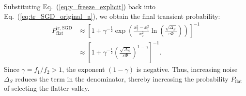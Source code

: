 \documentclass[aps,prx,reprint,superscriptaddress,longbibliography,nofootinbib,floatfix]{revtex4-2}
\begin{document}
Substituting Eq.~(\ref{eq:y_freeze_explicit}) back into Eq.~(\ref{eq:tr_SGD_original_a}), we obtain the final transient probability:
\begin{equation}
\label{eq:final_ptr_corrected}
\begin{split}
    P_{\mathrm{flat}}^{\mathrm{tr,SGD}} 
    &\approx  \left[1+\gamma^{-\frac{1}{2}} \exp\!\left(\frac{x_2^2-x_1^2}{x_2^2} \ln\left( \frac{\sqrt{\Delta_S}}{\varepsilon \Phi} \right)\right)\right]^{-1} \\
    &\approx \left[ 1 + \gamma^{-\frac{1}{2}} \left( \frac{\sqrt{\Delta_S}}{\varepsilon \Phi} \right)^{1-\gamma} \right]^{-1}.
\end{split}
\end{equation}
Since $\gamma = f_1/f_2 > 1$, the exponent $(1-\gamma)$ is negative. Thus, increasing noise $\Delta_S$ reduces the term in the denominator, thereby increasing the probability $P_{\mathrm{flat}}$ of selecting the flatter valley.



\end{document}
